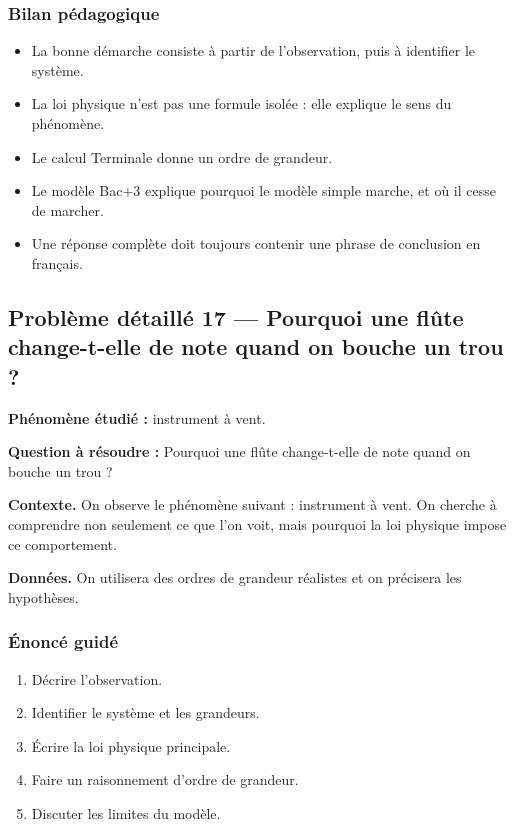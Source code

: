 \documentclass[11pt,a4paper]{article}
\begin{document}
\subsubsection*{Bilan pédagogique}

\begin{methodebox}
\begin{itemize}
  \item La bonne démarche consiste à partir de l'observation, puis à identifier le système.
  \item La loi physique n'est pas une formule isolée : elle explique le sens du phénomène.
  \item Le calcul Terminale donne un ordre de grandeur.
  \item Le modèle Bac+3 explique pourquoi le modèle simple marche, et où il cesse de marcher.
  \item Une réponse complète doit toujours contenir une phrase de conclusion en français.
\end{itemize}
\end{methodebox}

\subsection{Problème détaillé 17 — Pourquoi une flûte change-t-elle de note quand on bouche un trou ?}

\begin{exercicebox}
\textbf{Phénomène étudié :} instrument à vent.

\medskip
\textbf{Question à résoudre :} Pourquoi une flûte change-t-elle de note quand on bouche un trou ?

\medskip
\textbf{Contexte.} On observe le phénomène suivant : instrument à vent. On cherche à comprendre non seulement ce que l'on voit, mais pourquoi la loi physique impose ce comportement.

\medskip
\textbf{Données.} On utilisera des ordres de grandeur réalistes et on précisera les hypothèses.
\end{exercicebox}

\subsubsection*{Énoncé guidé}

\begin{enumerate}
  \item Décrire l'observation.
  \item Identifier le système et les grandeurs.
  \item Écrire la loi physique principale.
  \item Faire un raisonnement d'ordre de grandeur.
  \item Discuter les limites du modèle.
\end{enumerate}
\end{document}
